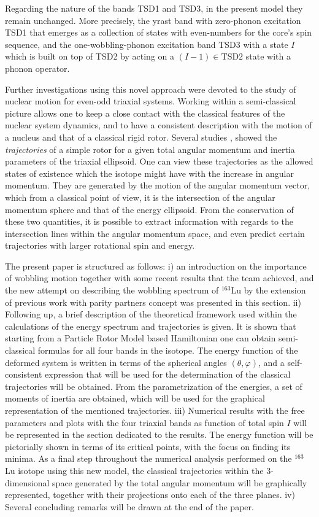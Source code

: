 \documentclass[%
 reprint,
 amsmath,
 amssymb,
 aps,
 floatfix,
]{revtex4-2}
\begin{document}
Regarding the nature of the bands TSD1 and TSD3, in the present model they remain unchanged. More precisely, the yrast band with zero-phonon excitation TSD1 that emerges as a collection of states with even-numbers for the core's spin sequence, and the one-wobbling-phonon excitation band TSD3 with a state $I$ which is built on top of TSD2 by acting on a $(I-1)\in \text{TSD2}$ state with a phonon operator.

Further investigations using this novel approach were devoted to the study of nuclear motion for even-odd triaxial systems. Working within a semi-classical picture allows one to keep a close contact with the classical features of the nuclear system dynamics, and to have a consistent description with the motion of a nucleus and that of a classical rigid rotor. Several studies \cite{frauendorf2014transverse}, \cite{lawrie2020tilted} showed the \emph{trajectories} of a simple rotor for a given total angular momentum and inertia parameters of the triaxial ellipsoid. One can view these trajectories as the allowed states of existence which the isotope might have with the increase in angular momentum. They are generated by the motion of the angular momentum vector, which from a classical point of view, it is the intersection of the angular momentum sphere and that of the energy ellipsoid. From the conservation of these two quantities, it is possible to extract information with regards to the intersection lines within the angular momentum space, and even predict certain trajectories with larger rotational spin and energy.
 
The present paper is structured as follows: i) an introduction on the importance of wobbling motion together with some recent results that the team achieved, and the new attempt on describing the wobbling spectrum of $^{163}$Lu by the extension of previous work with parity partners concept was presented in this section. ii) Following up, a brief description of the theoretical framework used within the calculations of the energy spectrum and trajectories is given. It is shown that starting from a Particle Rotor Model based Hamiltonian one can obtain semi-classical formulas for all four bands in the isotope. The energy function of the deformed system is written in terms of the spherical angles $(\theta,\varphi)$, and a self-consistent expression that will be used for the determination of the classical trajectories will be obtained. From the parametrization of the energies, a set of moments of inertia are obtained, which will be used for the graphical representation of the mentioned trajectories. iii) Numerical results with the free parameters and plots with the four triaxial bands as function of total spin $I$ will be represented in the section dedicated to the results. The energy function will be pictorially shown in terms of its critical points, with the focus on finding its minima. As a final step throughout the numerical analysis performed on the $^{163}$Lu isotope using this new model, the classical trajectories within the 3-dimensional space generated by the total angular momentum will be graphically represented, together with their projections onto each of the three planes. iv) Several concluding remarks will be drawn at the end of the paper.
\end{document}
